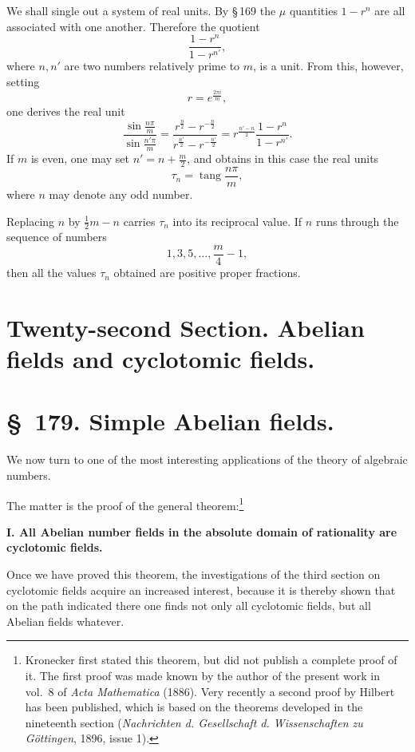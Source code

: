 \documentclass[11pt]{article}
\begin{document}
We shall single out a system of real units. By \S\,169 the $\mu$ quantities $1-r^n$ are all associated with one another. Therefore the quotient
\[
\frac{1-r^n}{1-r^{n'}},
\]
where $n,n'$ are two numbers relatively prime to $m$, is a unit. From this, however, setting
\[
r=e^{\frac{2\pi i}{m}},
\]
one derives the real unit
\begin{equation}
\frac{\sin\frac{n\pi}{m}}{\sin\frac{n'\pi}{m}}
=\frac{r^{\frac n2}-r^{-\frac n2}}{r^{\frac{n'}2}-r^{-\frac{n'}2}}
=r^{\frac{n'-n}{2}}\frac{1-r^n}{1-r^{n'}}.
\tag{6}
\end{equation}
If $m$ is even, one may set $n'=n+\frac m2$, and obtains in this case the real units
\begin{equation}
\tau_n=\operatorname{tang}\frac{n\pi}{m},
\tag{7}
\end{equation}
where $n$ may denote any odd number.

Replacing $n$ by $\frac12m-n$ carries $\tau_n$ into its reciprocal value. If $n$ runs through the sequence of numbers
\[
1,3,5,\ldots,\frac m4-1,
\]
then all the values $\tau_n$ obtained are positive proper fractions.

\clearpage
\section*{Twenty-second Section. Abelian fields and cyclotomic fields.}

\section*{\S~179. Simple Abelian fields.}

We now turn to one of the most interesting applications of the theory of algebraic numbers.

The matter is the proof of the general theorem:\footnote{Kronecker first stated this theorem, but did not publish a complete proof of it. The first proof was made known by the author of the present work in vol.~8 of \textit{Acta Mathematica} (1886). Very recently a second proof by Hilbert has been published, which is based on the theorems developed in the nineteenth section (\textit{Nachrichten d. Gesellschaft d. Wissenschaften zu Göttingen}, 1896, issue 1).}

\textbf{I. All Abelian number fields in the absolute domain of rationality are cyclotomic fields.}

Once we have proved this theorem, the investigations of the third section on cyclotomic fields acquire an increased interest, because it is thereby shown that on the path indicated there one finds not only all cyclotomic fields, but all Abelian fields whatever.
\end{document}
